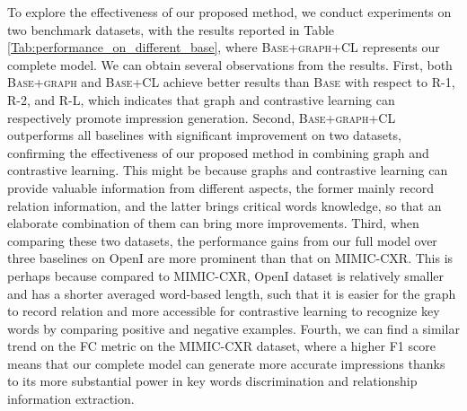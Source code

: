 \documentclass[11pt]{article}
\begin{document}
To explore the effectiveness of our proposed method, we conduct experiments on two benchmark datasets, with the results reported in Table \ref{Tab:performance_on_different_base}, where \textsc{Base+graph+CL} represents our complete model.
%
We can obtain several observations from the results.
%
First, both \textsc{Base+graph} and \textsc{Base+CL} achieve better results than \textsc{Base} with respect to R-1, R-2, and R-L, which indicates that graph and contrastive learning can respectively promote impression generation.
%
Second, \textsc{Base+graph+CL} outperforms all baselines with significant improvement on two datasets, confirming the effectiveness of our proposed method in combining graph and contrastive learning.
%
This might be because graphs and contrastive learning can provide valuable information from different aspects, the former mainly record relation information, and the latter brings critical words knowledge, so that an elaborate combination of them can bring more improvements.
%
Third, when comparing these two datasets, the performance gains from our full model over three baselines on OpenI are more prominent than that on MIMIC-CXR.
%
This is perhaps because compared to MIMIC-CXR, OpenI dataset is relatively smaller and has a shorter averaged word-based length, such that it is easier for the graph to record relation and more accessible for contrastive learning to recognize key words by comparing positive and negative examples.
%
Fourth, we can find a similar trend on the FC metric on the MIMIC-CXR dataset, where a higher F1 score means that our complete model can generate more accurate impressions thanks to its more substantial power in key words discrimination and relationship information extraction.
\end{document}
